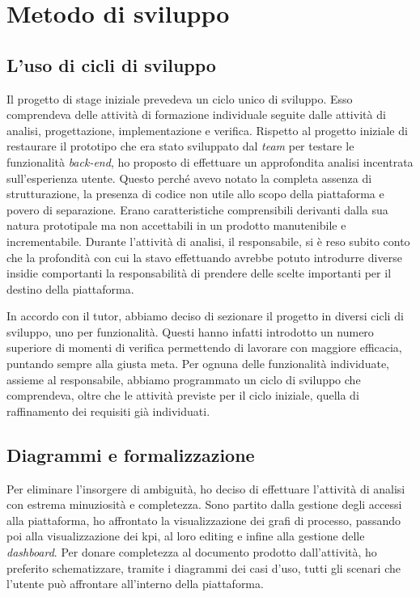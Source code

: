 \section{Metodo di sviluppo}
\subsection{L'uso di cicli di sviluppo}
Il progetto di stage iniziale prevedeva un ciclo unico di sviluppo. Esso comprendeva delle attività di formazione individuale seguite dalle attività di analisi, progettazione, implementazione e verifica.
Rispetto al progetto iniziale di restaurare il prototipo che era stato sviluppato dal \textit{team} per testare le funzionalità \textit{back-end}, ho proposto di effettuare un approfondita analisi incentrata sull'esperienza utente. Questo perché avevo notato la completa assenza di strutturazione, la presenza di codice non utile allo scopo della piattaforma e povero di separazione. Erano caratteristiche comprensibili derivanti dalla sua natura prototipale ma non accettabili in un prodotto manutenibile e incrementabile.
Durante l'attività di analisi, il responsabile, si è reso subito conto che la profondità con cui la stavo effettuando avrebbe potuto introdurre diverse insidie comportanti la responsabilità di prendere delle scelte importanti per il destino della piattaforma.

In accordo con il tutor, abbiamo deciso di sezionare il progetto in diversi cicli di sviluppo, uno per funzionalità. Questi hanno infatti introdotto un numero superiore di momenti di verifica permettendo di lavorare con maggiore efficacia, puntando sempre alla giusta meta.
Per ognuna delle funzionalità individuate, assieme al responsabile, abbiamo programmato un ciclo di sviluppo che comprendeva, oltre che le attività previste per il ciclo iniziale, quella di raffinamento dei requisiti già individuati.

\subsection{Diagrammi e formalizzazione}
\label{ssec:diagrams}
Per eliminare l'insorgere di ambiguità, ho deciso di effettuare l'attività di analisi con estrema minuziosità e completezza.
Sono partito dalla gestione degli accessi alla piattaforma, ho affrontato la visualizzazione dei grafi di processo, passando poi alla visualizzazione dei \acrshort{kpi}, al loro editing e infine alla gestione delle \textit{dashboard}.
Per donare completezza al documento prodotto dall'attività, ho preferito schematizzare, tramite i diagrammi dei casi d'uso, tutti gli scenari che l'utente può affrontare all'interno della piattaforma.

